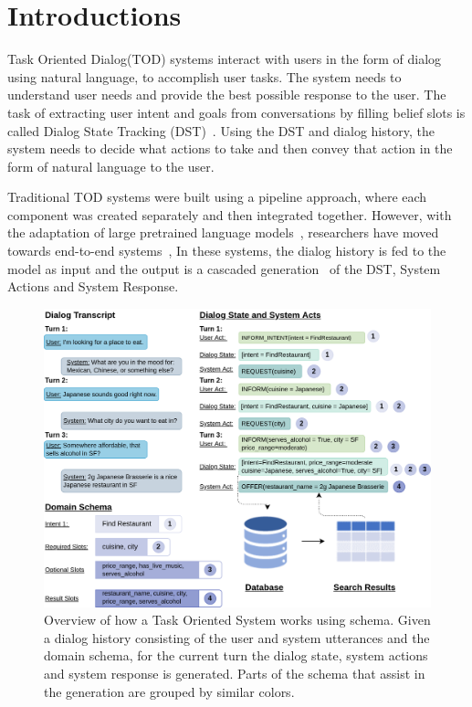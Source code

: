 \section{Introductions}

Task Oriented Dialog(TOD) systems interact with users in the form of dialog using natural language, to accomplish user tasks.
The system needs to understand user needs and provide the best possible response to the user.
The task of extracting user intent and goals from conversations by filling belief slots is called Dialog State Tracking (DST)~\cite{wang-etal-2016-inner}.
Using the DST and dialog history, the system needs to decide what actions to take and then convey that action in the form of natural language to the user.

Traditional TOD systems were built using a pipeline approach, where each component was created separately and then integrated together.
However, with the adaptation of large pretrained language models~\cite{Devlin2019BERTPO,Radford2019LanguageMA},
researchers have moved towards end-to-end systems~\cite{HosseiniAsl2020ASL,Peng2021SoloistBT,Lee2020SUMBTLaRLEN,Yang2020UBARTF,Jeon2021DORATP,Sun2022BORTBA,Yang2022UBARv2TM},
In these systems, the dialog history is fed to the model as input and the output is a cascaded generation~\cite{su2021multi} of the DST, System Actions and System Response.

\begin{figure}[!t]
    \centering
    \includegraphics[width=\linewidth]{assets/approach.png}
    \caption{
        Overview of how a Task Oriented System works using schema.
        Given a dialog history consisting of the user and system utterances and the domain schema, for the current turn the dialog state, system actions and system response is generated.
        Parts of the schema that assist in the generation are grouped by similar colors.
    }
    \label{fig:approach}
\end{figure}


